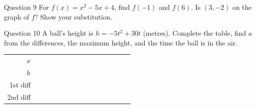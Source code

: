 \documentclass[11pt]{article}
\begin{document}
\begin{qbox}{Question 9}
For $f(x)=x^2-5x+4$, find $f(-1)$ and $f(6)$. Is $(3,-2)$ on the graph of $f$? Show your substitution.\workspace{2.6cm}
\end{qbox}

\begin{qbox}{Question 10}
A ball's height is $h=-5t^2+30t$ (metres). Complete the table, find $a$ from the differences, the maximum height, and the time the ball is in the air.
\begin{center}\renewcommand{\arraystretch}{1.15}\setlength{\tabcolsep}{2pt}\begin{tabular}{r|>{\centering\arraybackslash}p{0.62cm}>{\centering\arraybackslash}p{0.62cm}>{\centering\arraybackslash}p{0.62cm}>{\centering\arraybackslash}p{0.62cm}>{\centering\arraybackslash}p{0.62cm}>{\centering\arraybackslash}p{0.62cm}>{\centering\arraybackslash}p{0.62cm}>{\centering\arraybackslash}p{0.62cm}>{\centering\arraybackslash}p{0.62cm}>{\centering\arraybackslash}p{0.62cm}>{\centering\arraybackslash}p{0.62cm}>{\centering\arraybackslash}p{0.62cm}>{\centering\arraybackslash}p{0.62cm}>{\centering\arraybackslash}p{0.62cm}}
$x$ & \multicolumn{2}{c}{\colorbox{iagreen}{\makebox[1.12cm]{\strut \color{white}\bfseries $0$}}} & \multicolumn{2}{c}{\colorbox{iagreen}{\makebox[1.12cm]{\strut \color{white}\bfseries $1$}}} & \multicolumn{2}{c}{\colorbox{iagreen}{\makebox[1.12cm]{\strut \color{white}\bfseries $2$}}} & \multicolumn{2}{c}{\colorbox{iagreen}{\makebox[1.12cm]{\strut \color{white}\bfseries $3$}}} & \multicolumn{2}{c}{\colorbox{iagreen}{\makebox[1.12cm]{\strut \color{white}\bfseries $4$}}} & \multicolumn{2}{c}{\colorbox{iagreen}{\makebox[1.12cm]{\strut \color{white}\bfseries $5$}}} & \multicolumn{2}{c}{\colorbox{iagreen}{\makebox[1.12cm]{\strut \color{white}\bfseries $6$}}} \\[2pt]
$h$ & \multicolumn{2}{c}{\fbox{\makebox[0.94cm]{\strut}}} & \multicolumn{2}{c}{\fbox{\makebox[0.94cm]{\strut}}} & \multicolumn{2}{c}{\fbox{\makebox[0.94cm]{\strut}}} & \multicolumn{2}{c}{\fbox{\makebox[0.94cm]{\strut}}} & \multicolumn{2}{c}{\fbox{\makebox[0.94cm]{\strut}}} & \multicolumn{2}{c}{\fbox{\makebox[0.94cm]{\strut}}} & \multicolumn{2}{c}{\fbox{\makebox[0.94cm]{\strut}}} \\[2pt]
\textcolor{exblue}{\scriptsize 1st diff} & & \multicolumn{2}{c}{\fbox{\makebox[0.94cm]{\strut}}} & \multicolumn{2}{c}{\fbox{\makebox[0.94cm]{\strut}}} & \multicolumn{2}{c}{\fbox{\makebox[0.94cm]{\strut}}} & \multicolumn{2}{c}{\fbox{\makebox[0.94cm]{\strut}}} & \multicolumn{2}{c}{\fbox{\makebox[0.94cm]{\strut}}} & \multicolumn{2}{c}{\fbox{\makebox[0.94cm]{\strut}}} & \\[2pt]
\textcolor{qorange}{\scriptsize 2nd diff} & & & \multicolumn{2}{c}{\fbox{\makebox[0.94cm]{\strut}}} & \multicolumn{2}{c}{\fbox{\makebox[0.94cm]{\strut}}} & \multicolumn{2}{c}{\fbox{\makebox[0.94cm]{\strut}}} & \multicolumn{2}{c}{\fbox{\makebox[0.94cm]{\strut}}} & \multicolumn{2}{c}{\fbox{\makebox[0.94cm]{\strut}}} & & \\
\end{tabular}\end{center}\workspace{2.4cm}
\end{qbox}
\end{document}
